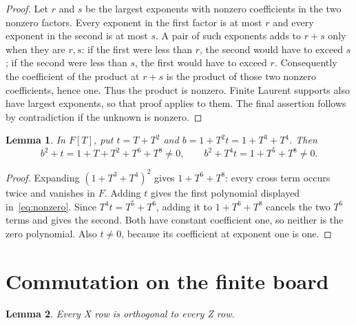 \documentclass{article}
\newtheorem{lemma}{Lemma}
\begin{document}
\begin{proof}
Let \(r\) and \(s\) be the largest exponents with nonzero coefficients in
the two nonzero factors. Every exponent in the first factor is at most \(r\) and
every exponent in the second is at most \(s\). A pair of such exponents adds to
\(r+s\) only when they are \(r,s\): if the first were less than \(r\), the second would
have to exceed \(s\); if the second were less than \(s\), the first would have to
exceed \(r\). Consequently the coefficient of the product at \(r+s\) is the product
of those two nonzero coefficients, hence one. Thus the product is nonzero.
Finite Laurent supports also have largest exponents, so that proof applies to
them. The final assertion follows by contradiction if the unknown is nonzero.
\end{proof}

\begin{lemma}\label{lem:nonzero}
In \(F[T]\), put \(t=T+T^2\) and \(b=1+T^2t=1+T^3+T^4\). Then
\begin{equation}\label{eq:nonzero}
 b^2+t=1+T+T^2+T^6+T^8\ne0,
 \qquad b^2+T^4t=1+T^5+T^8\ne0.
\end{equation}
\end{lemma}

\begin{proof}
Expanding \((1+T^3+T^4)^2\) gives \(1+T^6+T^8\): every cross term occurs
twice and vanishes in \(F\). Adding \(t\) gives the first polynomial displayed
in~\eqref{eq:nonzero}.
Since \(T^4t=T^5+T^6\), adding it to \(1+T^6+T^8\) cancels the two \(T^6\) terms and
gives the second. Both have constant coefficient one, so neither is the zero
polynomial. Also \(t\ne 0\), because its coefficient at exponent one is one.
\end{proof}

\section{Commutation on the finite board}\label{sec:commutation}

\begin{lemma}\label{lem:commute}
Every X row is orthogonal to every Z row.
\end{lemma}
\end{document}
